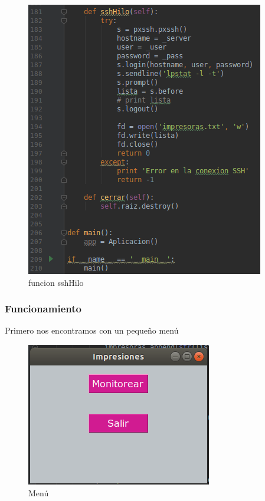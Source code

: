 \FloatBarrier
\begin{figure}[htbp!]
		\centering
			\includegraphics[width=.9\textwidth]{images/s6}
		\caption{funcion sshHilo}
		\label{image:s6}
\end{figure}
\FloatBarrier




\subsubsection{Funcionamiento}

Primero nos encontramos con un pequeño menú
\FloatBarrier
\begin{figure}[htbp!]
		\centering
			\includegraphics[width=.9\textwidth]{images/s7}
		\caption{Menú}
		\label{image:s7}
\end{figure}
\FloatBarrier

